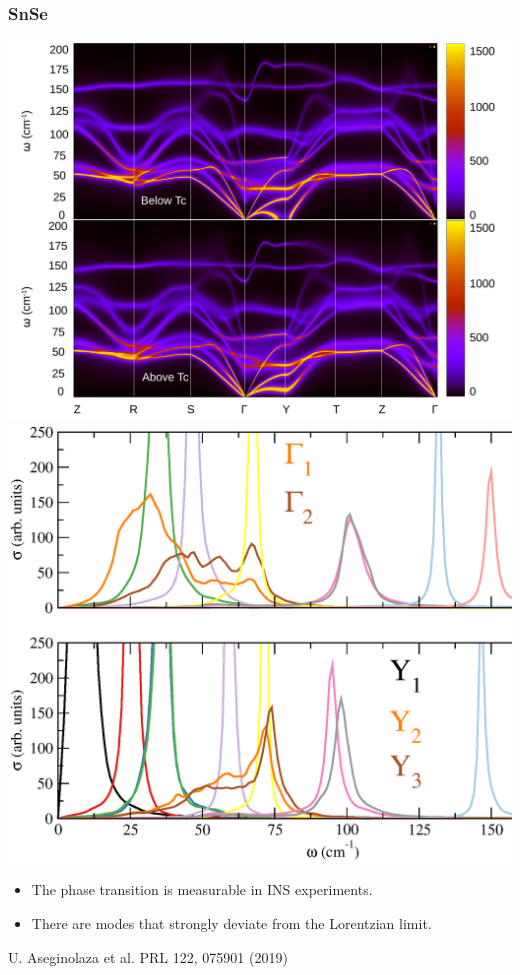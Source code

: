 \documentclass{beamer}
\begin{document}

\begin{frame}

\frametitle{SnSe}
\begin{center}
 \includegraphics[width=0.49\linewidth]{Pictures/SnSe/full-ins.pdf}
 \includegraphics[width=0.49\linewidth]{Pictures/SnSe/ins.eps}
\end{center}
\begin{itemize}
 \item The phase transition is measurable in INS experiments.
 \item There are modes that strongly deviate from the Lorentzian limit.
\end{itemize}
\begin{tiny}
 U. Aseginolaza et al. PRL 122, 075901 (2019)
\end{tiny}

\end{frame}

\end{document}
